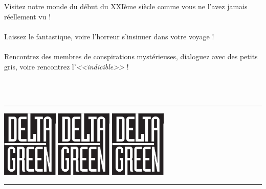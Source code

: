 \documentclass[40pt,twoside,a4paper]{article}
\begin{document}
\begin{minipage}[ht]{0.65\textwidth}
	{\Large
		Visitez notre monde du d{\'e}but du XXI{\`e}me si{\`e}cle comme vous ne l'avez jamais r{\'e}ellement vu !~\\~\\
		Laissez le fantastique, voire l'horreur s'insinuer dans votre voyage !~\\~\\
		Rencontrez des membres de conspirations myst{\'e}rieuses, dialoguez avec des petits gris, voire rencontrez l'\emph{<<indicible>>} !~\\~\\
	}

\end{minipage} ~\\

\hrule

\begin{center} 
	\includegraphics[width=0.20\textwidth]{../img/DeltaGreenLogo.png} \hfill
	\includegraphics[width=0.20\textwidth]{../img/DeltaGreenLogo.png} \hfill
	\includegraphics[width=0.20\textwidth]{../img/DeltaGreenLogo.png} %
\end{center}

\hrule

~\\
\end{document}
